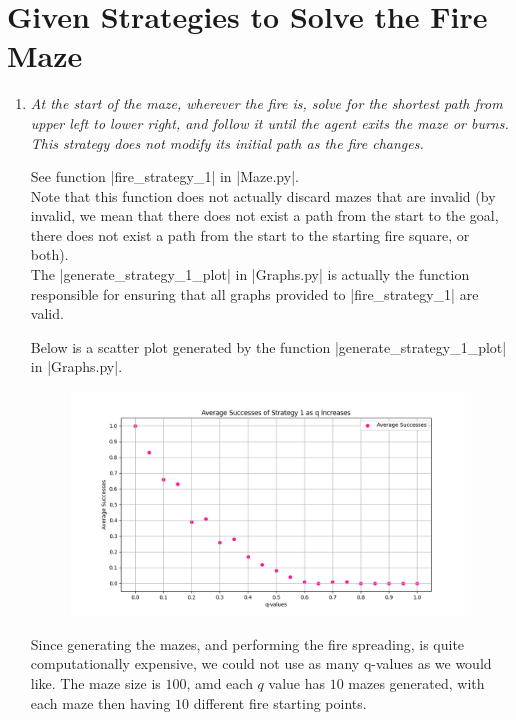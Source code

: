 \documentclass[12pt, twoside]{article}
\begin{document}
\section{Given Strategies to Solve the Fire Maze}
\begin{enumerate}
    \item 
        \textit{At the start of the maze, wherever the fire is, solve for the shortest path from upper left to lower right, and follow  it  until  the  agent  exits  the  maze  or  burns.   This  strategy  does  not  modify  its  initial  path  as  the  fire changes.}
    
        \vspace{4mm}
        See function \cverb|fire_strategy_1| in \cverb|Maze.py|. \\
        Note that this function does not actually discard mazes that are invalid (by invalid, we mean that there does not exist a path from the start to the goal, there does not exist a path from the start to the starting fire square, or both). \\
        The \cverb|generate_strategy_1_plot| in \cverb|Graphs.py| is actually the function responsible for ensuring that all graphs provided to \cverb|fire_strategy_1| are valid.

        \vspace{4mm}
        Below is a scatter plot generated by the function \cverb|generate_strategy_1_plot| in \cverb|Graphs.py|.

        \begin{figure}[h]
            \centering
            \includegraphics[scale = 0.6]{strategy_1_scatter.png}
        \end{figure}

        Since generating the mazes, and performing the fire spreading, is quite computationally expensive, we could not use as many q-values as we would like. The maze size is $100$, amd each $q$ value has $10$ mazes generated, with each maze then having $10$ different fire starting points.


\end{enumerate}
\end{document}
